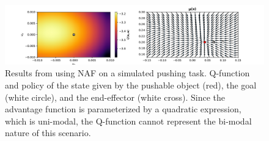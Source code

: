 \begin{figure}[h!]
    \centering
    \includegraphics[width=1.0 \textwidth]{res/naf_sim_unimode_q.pdf}

    \caption{Results from using NAF on a simulated pushing task. Q-function and
    policy of the state given by the pushable object (red), the goal (white
    circle), and the end-effector (white cross). Since the advantage function
    is parameterized by a quadratic expression, which is uni-modal, the
    Q-function cannot represent the bi-modal nature of this scenario.}

    \label{fig:naf_sim_unimode_q}
\end{figure}
